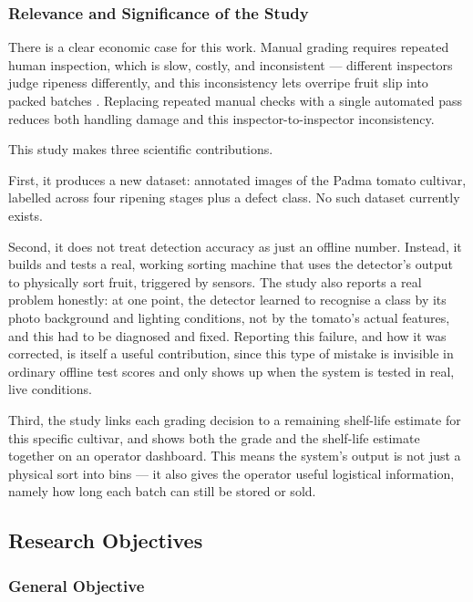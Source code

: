 \subsubsection{Relevance and Significance of the Study}
\label{sec:significance}

There is a clear economic case for this work. Manual grading requires repeated human inspection, which is slow, costly, and inconsistent — different inspectors judge ripeness differently, and this inconsistency lets overripe fruit slip into packed batches \citep{abekoon2024}. Replacing repeated manual checks with a single automated pass reduces both handling damage and this inspector-to-inspector inconsistency.

This study makes three scientific contributions.

First, it produces a new dataset: annotated images of the Padma tomato cultivar, labelled across four ripening stages plus a defect class. No such dataset currently exists.

Second, it does not treat detection accuracy as just an offline number. Instead, it builds and tests a real, working sorting machine that uses the detector's output to physically sort fruit, triggered by sensors. The study also reports a real problem honestly: at one point, the detector learned to recognise a class by its photo background and lighting conditions, not by the tomato's actual features, and this had to be diagnosed and fixed. Reporting this failure, and how it was corrected, is itself a useful contribution, since this type of mistake is invisible in ordinary offline test scores and only shows up when the system is tested in real, live conditions.

Third, the study links each grading decision to a remaining shelf-life estimate for this specific cultivar, and shows both the grade and the shelf-life estimate together on an operator dashboard. This means the system's output is not just a physical sort into bins — it also gives the operator useful logistical information, namely how long each batch can still be stored or sold.

\subsection{Research Objectives}
\label{sec:objectives}

\subsubsection{General Objective}

